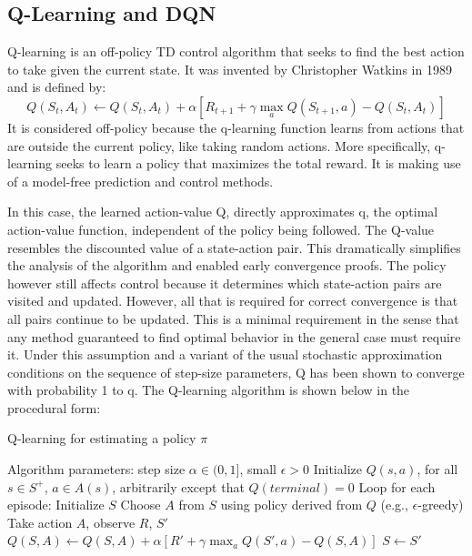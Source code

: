 \documentclass[12pt,a4paper]{article}
\begin{document}
\subsection{Q-Learning and DQN}\label{sec:q-learning}
Q-learning is an off-policy TD control algorithm that seeks to find the best action to take given the current state. It was invented by Christopher Watkins in 1989 and is defined by:
\begin{equation}
    \label{eq:q_learn}
    Q(S_t, A_t) \leftarrow Q(S_t, A_t) + \alpha [R_{t+1}+\gamma \max_aQ(S_{t+1},a)-Q(S_t,A_t)]
\end{equation}
It is considered off-policy because the q-learning function learns from actions that are outside the current policy, like taking random actions. More specifically, q-learning seeks to learn a policy that maximizes the total reward. It is making use of a model-free prediction and control methods.

In this case, the learned action-value Q, directly approximates q, the optimal
action-value function, independent of the policy being followed. The Q-value resembles the discounted value of a state-action pair. This dramatically
simplifies the analysis of the algorithm and enabled early convergence proofs. The policy however
still affects control because it determines which state-action pairs are visited and updated.
However, all that is required for correct convergence is that all pairs continue to be
updated. This is a minimal requirement in the sense that
any method guaranteed to find optimal behavior in the general case must require it.
Under this assumption and a variant of the usual stochastic approximation conditions on
the sequence of step-size parameters, Q has been shown to converge with probability 1 to
q. The Q-learning algorithm is shown below in the procedural form\cite{Sutton2015}:
\begin{algorithm}
    \caption{Q-learning for estimating a policy $\pi$}
    \begin{algorithmic}
    \State Algorithm parameters: step size $\alpha \in (0, 1]$, small  $\epsilon > 0$
    \State Initialize $Q(s,a)$, for all $s\in S^+$, $a\in A(s)$, arbitrarily except that $Q(terminal)=0$
    \State Loop for each episode:
        \State Initialize $S$
            \State Choose $A$ from $S$ using policy derived from $Q$ (e.g., $\epsilon$-greedy)
            \State Take action $A$, observe $R$, $S'$
            \State $Q(S, A) \leftarrow Q(S, A) + \alpha [R'+\gamma \max_aQ(S',a)-Q(S,A)]$
            \State $S \leftarrow S'$
        \EndFor
    \EndWhile
    \end{algorithmic}
\end{algorithm}
\end{document}
